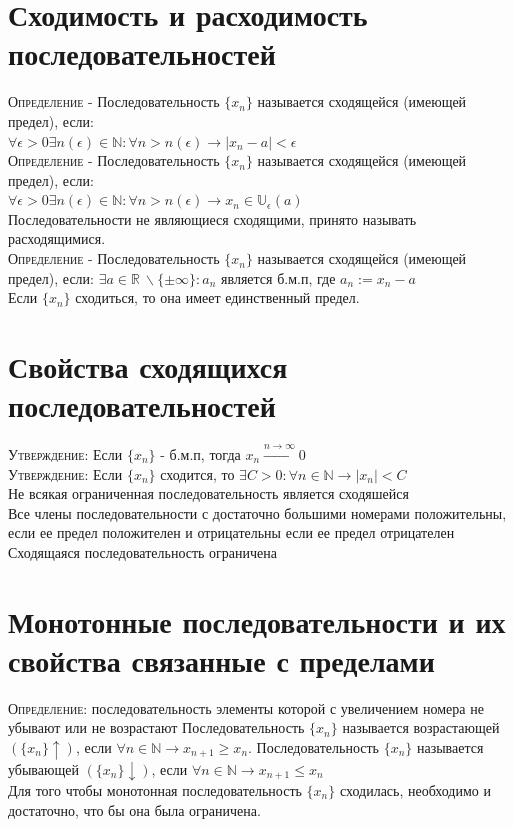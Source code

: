 \documentclass[14pt]{article}
\begin{document}
    \section{Сходимость и расходимость последовательностей}
        \textsc{Определение} - Последовательность $\{x_n\}$ называется сходящейся (имеющей предел), если: \\ $\forall \epsilon > 0 \exists n(\epsilon) \in \mathbb{N}: \forall n > n(\epsilon) \rightarrow |x_n - a| < \epsilon$ \\
        \textsc{Определение} - Последовательность $\{x_n\}$ называется сходящейся (имеющей предел), если: \\ $\forall \epsilon > 0 \exists n(\epsilon) \in \mathbb{N}: \forall n > n(\epsilon) \rightarrow x_n \in \mathbb{U}_{\epsilon} (a)$ \\
        Последовательности не являющиеся сходящими, принято называть расходящимися. \\
        \textsc{Определение} - Последовательность $\{x_n\}$ называется сходящейся (имеющей предел), если: $\exists a \in \mathbb{R}\ \backslash \{ \pm \infty \}: a_n$ является б.м.п, где $a_n := x_n - a$ \\
        Если $\{x_n\}$ сходиться, то она имеет единственный предел.

    \section{Свойства сходящихся последовательностей}
        \textsc{Утверждение: } Если $\{x_n\}$ - б.м.п, тогда $x_n \xrightarrow{n \rightarrow \infty} 0 $ \\
        \textsc{Утверждение: } Если $\{x_n\}$ сходится, то $\exists C > 0: \forall n \in \mathbb{N} \rightarrow |x_n| < C$ \\ 
        Не всякая ограниченная последовательность является сходяшейся \\ 
        Все члены последовательности с достаточно большими номерами положительны, если ее предел положителен и отрицательны если ее предел отрицателен \\
        Сходящаяся последовательность ограничена \\ 

    \section{Монотонные последовательности и их свойства связанные с пределами}
        \textsc{Определение:} последовательность элементы которой с увеличением номера не убывают или не возрастают 
        Последовательность $\{x_n\}$ называется возрастающей $(\{x_n\} \uparrow )$, если $\forall n \in \mathbb{N} \rightarrow x_{n+1} \geqslant x_n$. Последовательность $\{x_n\}$ называется убывающей $(\{x_n\} \downarrow )$, если $\forall n \in \mathbb{N} \rightarrow x_{n+1} \leqslant  x_n$ \\ 
        Для того чтобы монотонная последовательность  $\{x_n\}$ сходилась, необходимо и достаточно, что бы она была ограничена.
\end{document}
